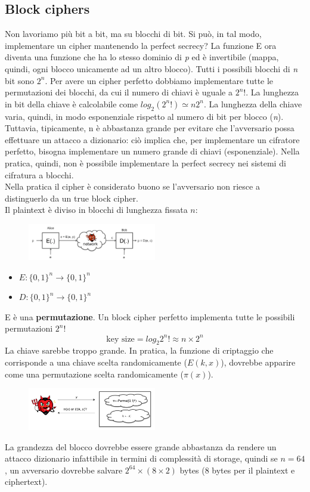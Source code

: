 \documentclass[a4paper,12pt]{article}
\begin{document}
\subsection{Block ciphers}
Non lavoriamo più bit a bit, ma su blocchi di bit. Si può, in tal modo, implementare un cipher mantenendo la perfect secrecy?
La funzione E ora diventa una funzione che ha lo stesso dominio di \textit{p} ed è invertibile (mappa, quindi, ogni blocco unicamente ad un altro blocco).
Tutti i possibili blocchi di \textit{n} bit sono $2^{n}$. Per avere un cipher perfetto dobbiamo implementare tutte le permutazioni dei blocchi, da cui il numero di chiavi è uguale a $2^{n}!$.
La lunghezza in bit della chiave è calcolabile come $log_2 (2^{n}!) \simeq n2^{n}$.
La lunghezza della chiave varia, quindi, in modo esponenziale rispetto al numero di bit per blocco (\textit{n}). \\
Tuttavia, tipicamente, n è abbastanza grande per evitare che l'avversario possa effettuare un attacco a dizionario: ciò implica che, per implementare un cifratore perfetto,
bisogna implementare un numero grande di chiavi (esponenziale). Nella pratica, quindi, non è possibile implementare la perfect secrecy nei sistemi di cifratura a blocchi. \\
Nella pratica il cipher è considerato buono se l'avversario non riesce a distinguerlo da un true block cipher. \\
Il plaintext è diviso in blocchi di lunghezza fissata $n$:
\begin{figure}[H]
  \centering
  \includegraphics[width=0.5\textwidth]{img/block-cipher}
\end{figure}
\begin{itemize}
	\item $E : \{0,1\}^n \rightarrow \{0,1\}^n$
	\item $D : \{0,1\}^n \rightarrow \{0,1\}^n$
\end{itemize}
E è una \textbf{permutazione}.
Un block cipher perfetto implementa tutte le possibili permutazioni $2^{n}!$
$$\text{key size} = log_2 2^n! \approx n \times 2^n$$
La chiave sarebbe troppo grande.
In pratica, la funzione di criptaggio che corrisponde a una chiave scelta randomicamente ($E(k, x)$), dovrebbe apparire come una permutazione scelta randomicamente ($\pi(x)$).
\begin{figure}[H]
  \centering
  \includegraphics[width=0.5\textwidth]{img/perm}
\end{figure}
La grandezza del blocco dovrebbe essere grande abbastanza da rendere un attacco dizionario infattibile in termini di complessità di storage, quindi se $n = 64$, un avversario dovrebbe salvare $2^{64} \times (8 \times 2)$ bytes (8 bytes per il plaintext e ciphertext).
\end{document}
